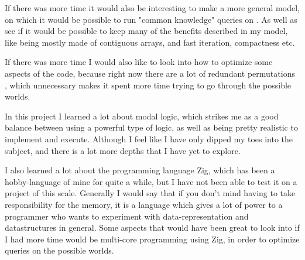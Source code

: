 If there was more time it would also be interesting to make a more general model, on which it would be possible to run "common knowledge" queries on . As well as see if it would be possible to keep many of the benefits described in my model, like being mostly made of contiguous arrays, and fast iteration, compactness etc.  

If there was more time I would also like to look into how to optimize some aspects of the code, because right now there are a lot of redundant permutations , which unnecessary makes it spent more time trying to go through the possible worlds.

In this project I learned a lot about modal logic, which strikes me as a good balance between using a powerful type of logic, as well as being pretty realistic to implement and execute. Although I feel like I have only dipped my toes into the subject, and there is a lot more depths that I have yet to explore.

I also learned a lot about the programming language Zig, which has been a hobby-language of mine for quite a while, but I have not been able to test it on a project of this scale. Generally I would say that if you don't mind having to take responsibility for the memory, it is a language which gives a lot of power to a programmer who wants to experiment with data-representation and datastructures in general. Some aspects that would have been great to look into if I had more time would be multi-core programming using Zig, in order to optimize queries on the possible worlds.
